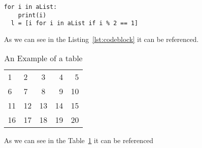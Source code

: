 
\begin{lstlisting}[caption={A codeblock},label=lst:codeblock,frame=single]
  for i in aList:
    print(i)
  l = [i for i in aList if i % 2 == 1]
\end{lstlisting}

As we can see in the Listing~\ref{lst:codeblock} it can be referenced.


\begin{table}[H]
  \begin{tabular}{llcrr}
  1  & 2  & 3  & 4  & 5  \\
  6  & 7  & 8  & 9  & 10 \\
  11 & 12 & 13 & 14 & 15 \\
  16 & 17 & 18 & 19 & 20
  \end{tabular}
  \caption{An Example of a table}\label{tab:table}
\end{table}

As we can see in the Table~\ref{tab:table} it can be referenced
